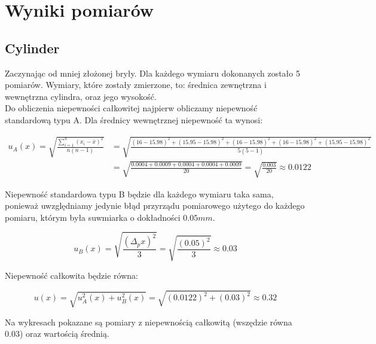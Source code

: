 {\section{Wyniki pomiarów}}

{\subsection{Cylinder}}

Zaczynając od mniej złożonej bryły. Dla każdego wymiaru dokonanych zostało 5 pomiarów.
Wymiary, które zostały zmierzone, to: średnica zewnętrzna i wewnętrzna cylindra, oraz jego wysokość. \\

Do obliczenia niepewności całkowitej najpierw obliczamy niepewność standardową typu A.
Dla średnicy wewnętrznej niepewność ta wynosi:

\begin{equation*}
    \begin{aligned}
        \displaystyle u_A(x) = \sqrt{ \frac{ \displaystyle \sum_{i=1}^{n} (x_i - \overline{x} )^2 }{ n(n - 1) }  }
        &= \sqrt{ \frac{ (16 - 15.98)^2 + (15.95 - 15.98)^2 + (16 - 15.98)^2 + (16 - 15.98)^2 + (15.95 - 15.98)^2 }{ 5(5 - 1) } } \\
        &= \sqrt{ \frac{ 0.0004 + 0.0009 + 0.0004 + 0.0004 + 0.0009 }{ 20 } }
        = \sqrt{ \frac{ 0.003 }{ 20 } } \approx 0.0122
    \end{aligned}
\end{equation*}

Niepewność standardowa typu B będzie dla każdego wymiaru taka sama,
ponieważ uwzględniamy jedynie błąd przyrządu pomiarowego użytego do każdego pomiaru, którym była suwmiarka o dokładności $0.05mm$.

\begin{equation*}
    \displaystyle u_B(x) = \sqrt{ \frac{ (\Delta_p x)^2 }{3} } = \sqrt{ \frac{ (0.05)^2 }{3} } \approx 0.03
\end{equation*}

Niepewność całkowita będzie równa: 

\begin{equation*}
    u(x) = \sqrt{ u_A^2(x) + u_B^2(x) } = \sqrt{ (0.0122)^2 + (0.03)^2 } \approx 0.32
\end{equation*} 

\newpage

Na wykresach pokazane są pomiary z niepewnością całkowitą (wszędzie równa 0.03) oraz wartością średnią.

